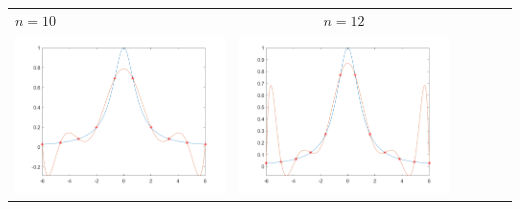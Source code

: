 \begin{tabular}{l*{5}{c}}
\hspace{3.5cm}\(n=10\) &  \(n=12\) \\
\includegraphics[scale=0.5]{cap4/4_9/10.png} &  \includegraphics[scale=0.5]{cap4/4_9/12.png} \\
\end{tabular} \\ \\

